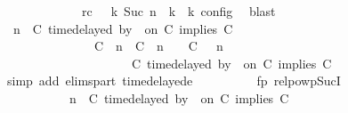 \begin{isabellebody}
\ \ \ \ \ \ \ \ \ \ \ \ \ rc{\isacharcolon}{\isacartoucheopen}{\isasymrho}\ {\isasymin}\ {\isasymlbrakk}\ {\isasymGamma}\isactrlsub k{\isacharcomma}\ Suc\ n\ {\isasymturnstile}\ {\isasymPsi}\isactrlsub k\ {\isasymtriangleright}\ {\isasymPhi}\isactrlsub k\ {\isasymrbrakk}\isactrlsub c\isactrlsub o\isactrlsub n\isactrlsub f\isactrlsub i\isactrlsub g{\isacartoucheclose}\ \isamarkupfalse%
\ blast\isanewline
\ \ \ \ \ \ \ \ \isamarkupfalse%
\ {\isacartoucheopen}{\isacharparenleft}{\isasymGamma}{\isacharcomma}\ n\ {\isasymturnstile}\ {\isacharparenleft}{\isacharparenleft}C\ time{\isacharminus}delayed\ by\ {\isasymdelta}{\isasymtau}\ on\ C\ implies\ C\ {\isacharhash}\ {\isasymPsi}{\isacharparenright}\ {\isasymtriangleright}\ {\isasymPhi}{\isacharparenright}\isanewline
\ \ \ \ \ \ \ \ \ \ \ \ \ \ {\isasymhookrightarrow}\ {\isacharparenleft}{\isacharparenleft}{\isacharparenleft}C\ {\isasymUp}\ n{\isacharparenright}\ {\isacharhash}\ {\isacharparenleft}C\ {\isacharat}\ n\ {\isasymoplus}\ {\isasymdelta}{\isasymtau}\ {\isasymRightarrow}\ C\ {\isacharhash}\ {\isasymGamma}{\isacharparenright}{\isacharcomma}\ n\isanewline
\ \ \ \ \ \ \ \ \ \ \ \ \ \ \ \ \ \ {\isasymturnstile}\ {\isasymPsi}\ {\isasymtriangleright}\ {\isacharparenleft}{\isacharparenleft}C\ time{\isacharminus}delayed\ by\ {\isasymdelta}{\isasymtau}\ on\ C\ implies\ C\ {\isacharhash}\ {\isasymPhi}{\isacharparenright}{\isacharparenright}{\isacartoucheclose}\isanewline
\ \ \ \ \ \ \ \ \ \ \isamarkupfalse%
\ {\isacharparenleft}simp\ add{\isacharcolon}\ elims{\isacharunderscore}part\ timedelayed{\isacharunderscore}e{}{\isacharparenright}\isanewline
\ \ \ \ \ \ \ \ \isamarkupfalse%
\ fp\ relpowp{\isacharunderscore}Suc{\isacharunderscore}I{}\ \isamarkupfalse%
\isanewline
\ \ \ \ \ \ \ \ \ \ {\isacartoucheopen}{\isacharparenleft}{\isasymGamma}{\isacharcomma}\ n\ {\isasymturnstile}\ {\isacharparenleft}{\isacharparenleft}C\ time{\isacharminus}delayed\ by\ {\isasymdelta}{\isasymtau}\ on\ C\ implies\ C\ {\isacharhash}\ {\isasymPsi}{\isacharparenright}\ {\isasymtriangleright}\ {\isasymPhi}{\isacharparenright}\isanewline

\end{isabellebody}
